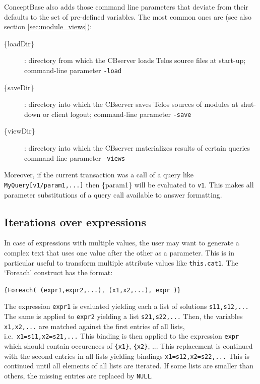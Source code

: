 ConceptBase also adds those command line parameters that deviate from their defaults to the set
of pre-defined variables. The most common ones are (see also section \ref{sec:module_views}):

\begin{description}

\item[\{loadDir\}]: directory from which the CBserver loads Telos source files at start-up;
                    command-line parameter {\tt -load}

\item[\{saveDir\}]: directory into which the CBserver saves Telos sources of modules at shut-down
                    or client logout;
                    command-line parameter {\tt -save}

\item[\{viewDir\}]: directory into which the CBserver materializes results of certain queries
                    command-line parameter {\tt -views}

\end{description}

Moreover, if the current transaction was a call of a query like {\tt MyQuery[v1/param1,...]} then
\{param1\} will be evaluated to {\tt v1}. This makes all parameter substitutions of a query call
available to answer formatting.

\subsection{Iterations over expressions}

In case of expressions with multiple values, the user may want to generate a 
complex text that uses one value after the other as a parameter. 
This is in particular useful to transform multiple attribute values like {\tt this.cat1}.
The `Foreach' construct has the format:

\verb+{Foreach( (expr1,expr2,...), (x1,x2,...), expr )}+

The expression {\tt expr1} is evaluated yielding each a list of solutions {\tt s11,s12,...} The same is applied to {\tt expr2} yielding a list
{\tt s21,s22,...} Then, the
variables {\tt x1,x2,...} are matched against the first entries of all lists, i.e.\ {\tt x1=s11,x2=s21,...} This binding is then applied to the expression
{\tt expr}
which should contain occurences of \verb+{x1}+, \verb+{x2}+, ... This replacement is continued with the second entries in all lists yielding bindings
{\tt x1=s12,x2=s22,...} This is continued until all elements of all lists are iterated. If some lists are smaller than others, the missing entries are replaced by {\tt NULL}.

